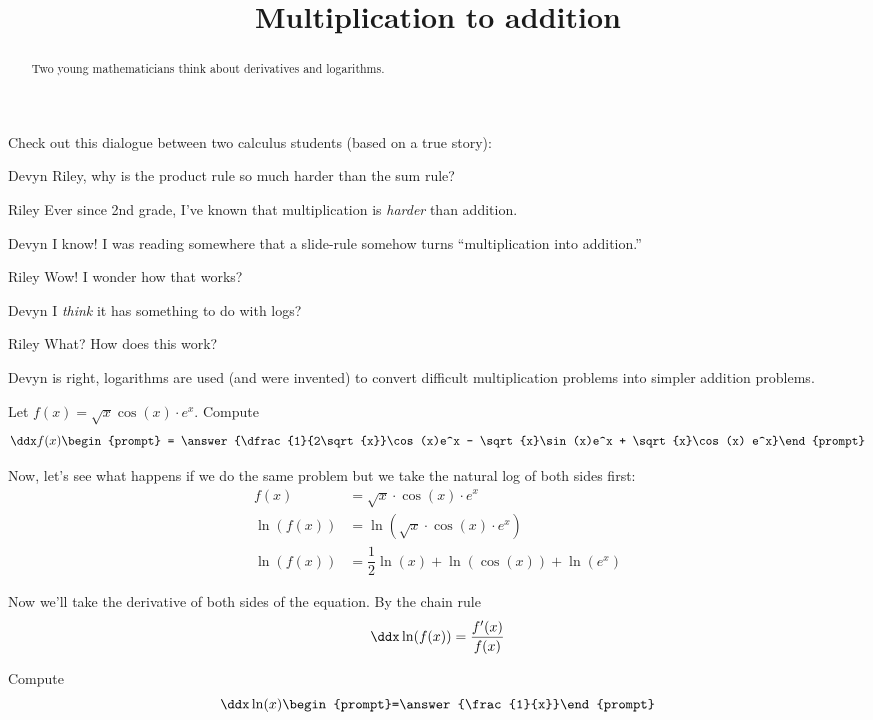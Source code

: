 \documentclass{ximera}
\title[Break-Ground:]{Multiplication to addition}
\begin{document}
\begin{abstract}
Two young mathematicians think about derivatives and logarithms.
\end{abstract}
\maketitle


Check out this dialogue between two calculus students (based on a true
story):

\begin{dialogue}
\item[Devyn] Riley, why is the product rule so much harder than the sum rule?
\item[Riley] Ever since 2nd grade, I've known that multiplication is
  \textit{harder} than addition.
\item[Devyn] I know! I was reading somewhere that a slide-rule somehow
  turns ``multiplication into addition.''
\item[Riley] Wow! I wonder how that works?
\item[Devyn] I \textit{think} it has something to do with logs?
\item[Riley] What? How does this work?
\end{dialogue}

Devyn is right, logarithms are used (and were invented) to convert
difficult multiplication problems into simpler addition problems.

\begin{problem}
  Let $f(x) =  \sqrt{x} \cos(x) \cdot e^x$. Compute
  \[
  \ddx f(x)\begin{prompt} = \answer{\dfrac{1}{2\sqrt{x}}\cos(x)e^x -  \sqrt{x}\sin(x)e^x +  \sqrt{x}\cos(x) e^x}\end{prompt}
  \]
\end{problem}

Now, let's see what happens if we do the same problem but we take the
natural log of both sides first:
\begin{align*}
  f(x) &= \sqrt{x}\cdot\cos(x)\cdot e^x\\
  \ln(f(x)) &= \ln( \sqrt{x}\cdot\cos(x)\cdot e^x)\\
  \ln(f(x)) &=\dfrac{1}{2}\ln{(x)} + \ln(\cos(x)) + \ln(e^x)
\end{align*}

Now we'll take the derivative of both sides of the equation.
By the chain rule
\[
\ddx \ln(f(x))= \frac{f'(x)}{f(x)}
\]


\begin{problem}
  Compute %
  \[
  \ddx \ln(x)  \begin{prompt}=\answer{\frac{1}{x}}\end{prompt}
  \]
\end{problem}
\end{document}
